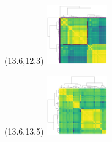 \documentclass{article}
\begin{document}
\begin{textblock}{1}(13.6,12.3)   \includegraphics[height=1in]{main-figure-assets/clustermaps/chr22.pdf}                          \end{textblock}
\begin{textblock}{1}(13.6,13.5)   \includegraphics[height=1in]{main-figure-assets/clustermaps/chrX.pdf}                           \end{textblock}
\end{document}
